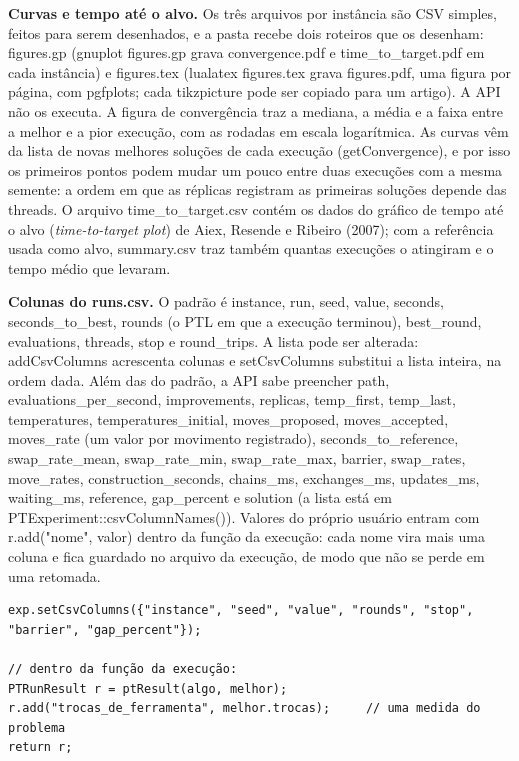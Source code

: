 \documentclass[10pt,a4paper]{article}
\newcommand{\code}[1]{{\ttfamily #1}}
\begin{document}
\textbf{Curvas e tempo até o alvo.} Os três arquivos por instância são CSV simples, feitos para serem desenhados, e a pasta recebe dois roteiros que os desenham: \code{figures.gp} (\code{gnuplot figures.gp} grava \code{convergence.pdf} e \code{time\_to\_target.pdf} em cada instância) e \code{figures.tex} (\code{lualatex figures.tex} grava \code{figures.pdf}, uma figura por página, com pgfplots; cada \code{tikzpicture} pode ser copiado para um artigo). A API não os executa. A figura de convergência traz a mediana, a média e a faixa entre a melhor e a pior execução, com as rodadas em escala logarítmica. As curvas vêm da lista de novas melhores soluções de cada execução (\code{getConvergence}), e por isso os primeiros pontos podem mudar um pouco entre duas execuções com a mesma semente: a ordem em que as réplicas registram as primeiras soluções depende das threads. O arquivo \code{time\_to\_target.csv} contém os dados do gráfico de tempo até o alvo (\textit{time-to-target plot}) de Aiex, Resende e Ribeiro (2007); com a referência usada como alvo, \code{summary.csv} traz também quantas execuções o atingiram e o tempo médio que levaram.

\textbf{Colunas do \code{runs.csv}.} O padrão é \code{instance}, \code{run}, \code{seed}, \code{value}, \code{seconds}, \code{seconds\_to\_best}, \code{rounds} (o PTL em que a execução terminou), \code{best\_round}, \code{evaluations}, \code{threads}, \code{stop} e \code{round\_trips}. A lista pode ser alterada: \code{addCsvColumns} acrescenta colunas e \code{setCsvColumns} substitui a lista inteira, na ordem dada. Além das do padrão, a API sabe preencher \code{path}, \code{evaluations\_per\_second}, \code{improvements}, \code{replicas}, \code{temp\_first}, \code{temp\_last}, \code{temperatures}, \code{temperatures\_initial}, \code{moves\_proposed}, \code{moves\_accepted}, \code{moves\_rate} (um valor por movimento registrado), \code{seconds\_to\_reference}, \code{swap\_rate\_mean}, \code{swap\_rate\_min}, \code{swap\_rate\_max}, \code{barrier}, \code{swap\_rates}, \code{move\_rates}, \code{construction\_seconds}, \code{chains\_ms}, \code{exchanges\_ms}, \code{updates\_ms}, \code{waiting\_ms}, \code{reference}, \code{gap\_percent} e \code{solution} (a lista está em \code{PTExperiment::csvColumnNames()}). Valores do próprio usuário entram com \code{r.add("nome", valor)} dentro da função da execução: cada nome vira mais uma coluna e fica guardado no arquivo da execução, de modo que não se perde em uma retomada.

\begin{lstlisting}[style=cpp]
exp.setCsvColumns({"instance", "seed", "value", "rounds", "stop", "barrier", "gap_percent"});

// dentro da função da execução:
PTRunResult r = ptResult(algo, melhor);
r.add("trocas_de_ferramenta", melhor.trocas);     // uma medida do problema
return r;
\end{lstlisting}
\end{document}
